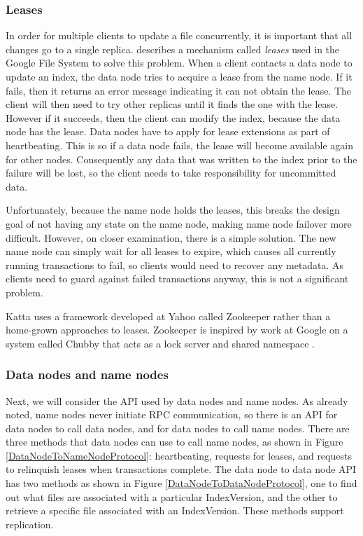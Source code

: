 \documentclass[a4paper,10pt]{article}
\begin{document}
\subsubsection{Leases}
In order for multiple clients to update a file concurrently, it is important that all changes go to a single replica. \cite{citeulike:300020} describes a mechanism called \emph{leases} used in the Google File System to solve this problem. When a client contacts a data node to update an index, the data node tries to acquire a lease from the name node. If it fails, then it returns an error message indicating it can not obtain the lease. The client will then need to try other replicas until it finds the one with the lease. However if it succeeds, then the client can modify the index, because the data node has the lease. Data nodes have to apply for lease extensions as part of heartbeating. This is so if a data node fails, the lease will become available again for other nodes. Consequently any data that was written to the index prior to the failure will be lost, so the client needs to take responsibility for uncommitted data. 

Unfortunately, because the name node holds the leases, this breaks the design goal of not having any state on the name node, making name node failover more difficult. However, on closer examination, there is a simple solution. The new name node can simply wait for all leases to expire, which causes all currently running transactions to fail, so clients would need to recover any metadata. As clients need to guard against failed transactions anyway, this is not a significant problem.

Katta \cite{katta} uses a framework developed at Yahoo called Zookeeper \cite{zookeeper} rather than a home-grown approaches to leases. Zookeeper is inspired by work at Google on a system called Chubby that acts as a lock server and shared namespace \cite{Bur06,paxos-live}. 

\subsubsection{Data nodes and name nodes}

Next, we will consider the API used by data nodes and name nodes. As already noted, name nodes never initiate RPC communication, so there is an API for data nodes to call data nodes, and for data nodes to call name nodes. There are three methods that data nodes can use to call name nodes, as shown in Figure \ref{DataNodeToNameNodeProtocol}: heartbeating, requests for leases, and requests to relinquish leases when transactions complete. The data node to data node API has two methods as shown in Figure \ref{DataNodeToDataNodeProtocol}, one to find out what files are associated with a particular IndexVersion, and the other to retrieve a specific file associated with an IndexVersion. These methods support replication.  
\end{document}
